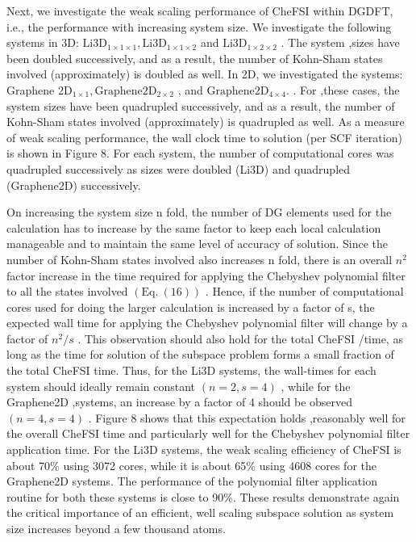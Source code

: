 \documentclass[
  10
]{article}
\begin{document}
Next, we investigate the weak scaling performance of CheFSI within
DGDFT, i.e., the performance with increasing system size. We investigate
the following systems in 3D:
\(\mathrm { L i } 3 \mathrm { D } _ { 1 \times 1 \times 1 } , \mathrm { L i } 3 \mathrm { D } _ { 1 \times 1 \times 2 }\)
and \(\mathrm { L i } 3 \mathrm { D } _ { 1 \times 2 \times 2 }\) . The
system ,sizes have been doubled successively, and as a result, the
number of Kohn-Sham states involved (approximately) is doubled as well.
In 2D, we investigated the systems: Graphene
\(\mathrm { 2 D _ { 1 \times 1 } , G r a p h e n e 2 D _ { 2 \times 2 } }\)
, and \(\mathrm { G r a p h e n e } 2 \mathrm { D } _ { 4 \times 4 } .\)
. For ,these cases, the system sizes have been quadrupled successively,
and as a result, the number of Kohn-Sham states involved (approximately)
is quadrupled as well. As a measure of weak scaling performance, the
wall clock time to solution (per SCF iteration) is shown in Figure 8.
For each system, the number of computational cores was quadrupled
successively as sizes were doubled (Li3D) and quadrupled (Graphene2D)
successively.

On increasing the system size n fold, the number of DG elements used for
the calculation has to increase by the same factor to keep each local
calculation manageable and to maintain the same level of accuracy of
solution. Since the number of Kohn-Sham states involved also increases n
fold, there is an overall \(n ^ { 2 }\) factor increase in the time
required for applying the Chebyshev polynomial filter to all the states
involved \(\left( \mathrm { E q } . \ ( 1 6 ) \right)\) . Hence, if the
number of computational cores used for doing the larger calculation is
increased by a factor of s, the expected wall time for applying the
Chebyshev polynomial filter will change by a factor of \(n ^ { 2 } / s\)
. This observation should also hold for the total CheFSI /time, as long
as the time for solution of the subspace problem forms a small fraction
of the total CheFSI time. Thus, for the Li3D systems, the wall-times for
each system should ideally remain constant \(( n = 2 , s = 4 )\) , while
for the Graphene2D ,systems, an increase by a factor of 4 should be
observed \(( n = 4 , s = 4 )\) . Figure 8 shows that this expectation
holds ,reasonably well for the overall CheFSI time and particularly well
for the Chebyshev polynomial filter application time. For the Li3D
systems, the weak scaling efficiency of CheFSI is about 70\% using 3072
cores, while it is about 65\% using 4608 cores for the Graphene2D
systems. The performance of the polynomial filter application routine
for both these systems is close to 90\%. These results demonstrate again
the critical importance of an efficient, well scaling subspace solution
as system size increases beyond a few thousand atoms.
\end{document}

